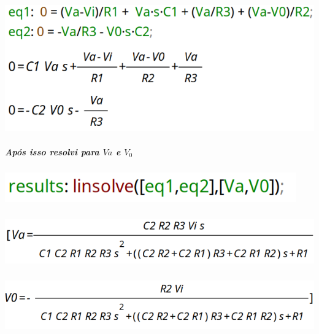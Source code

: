 \documentclass[12pt,twoside, a4paper, twocolumn]{article}
\begin{document}
\begin{adjustbox}{scale=0.4}
    \includegraphics{eqs.png}
\end{adjustbox}








\subparagraph*{Após isso resolvi para $Va$ e $V_0$}








\subparagraph*{}








\begin{adjustbox}{scale=0.4}
    \includegraphics{linsolve.png}
\end{adjustbox}




\subparagraph*{}




\begin{adjustbox}{scale=0.4}
    \includegraphics{va.png}
\end{adjustbox}




\subparagraph*{}




\begin{adjustbox}{scale=0.4}
    \includegraphics{v0.png}
\end{adjustbox}
\end{document}
